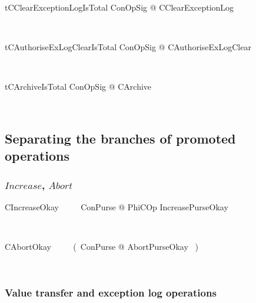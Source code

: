 \begin{LNewThm}
\begin{theorem}{tCClearExceptionLogIsTotal}
    \forall ConOpSig @ \pre CClearExceptionLog
\end{theorem}~\end{LNewThm}

\begin{LNewThm}
\begin{theorem}{tCAuthoriseExLogClearIsTotal}
    \forall ConOpSig @ \pre CAuthoriseExLogClear
\end{theorem}~\end{LNewThm}

\begin{LNewThm}
\begin{theorem}{tCArchiveIsTotal}
    \forall ConOpSig @ \pre CArchive
\end{theorem}~\end{LNewThm}

\subsection{Separating the branches of promoted operations}

\subsubsection*{$Increase$, $Abort$}

\begin{LNewSDef}
\begin{zed}
   CIncreaseOkay ~~~~ \exists \Delta ConPurse @ PhiCOp \land IncreasePurseOkay
\end{zed}~\end{LNewSDef}

\begin{LNewSDef}
\begin{zed}
   CAbortOkay ~~~~ (~\exists \Delta ConPurse @ AbortPurseOkay \land [~ PhiCOp | m! = mondexError ~]~)
\end{zed}~\end{LNewSDef}

\subsubsection*{Value transfer and exception log operations}

